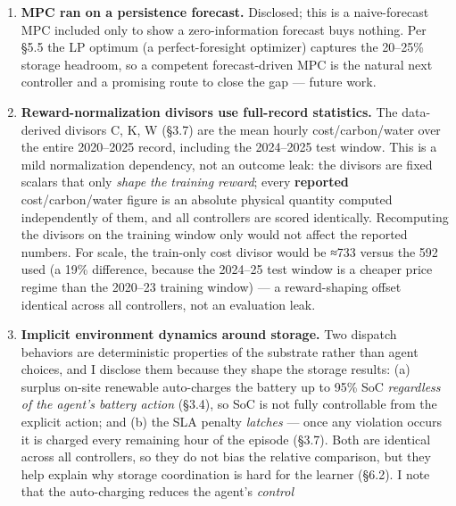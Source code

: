 \documentclass[
  11pt,
]{article}
\begin{document}
\begin{enumerate}
  8a. \textbf{The LP optimum is a conservative ceiling.} The LP does not
  exploit the cooling-offset cost lever and models deferral with the
  environment's own 1/12-per-hour backlog drain rather than free
  load-shifting; both make it \emph{under}-optimize slightly, so the
  reported optimality gaps (20--25\% on storage) are \textbf{lower
  bounds} on the true gap. It is verified to satisfy LP ≤ RuleBased on
  every episode.
\item
  \textbf{MPC ran on a persistence forecast.} Disclosed; this is a
  naive-forecast MPC included only to show a zero-information forecast
  buys nothing. Per §5.5 the LP optimum (a perfect-foresight optimizer)
  captures the 20--25\% storage headroom, so a competent forecast-driven
  MPC is the natural next controller and a promising route to close the
  gap --- future work.
\item
  \textbf{Reward-normalization divisors use full-record statistics.} The
  data-derived divisors C, K, W (§3.7) are the mean hourly
  cost/carbon/water over the entire 2020--2025 record, including the
  2024--2025 test window. This is a mild normalization dependency, not
  an outcome leak: the divisors are fixed scalars that only \emph{shape
  the training reward}; every \textbf{reported} cost/carbon/water figure
  is an absolute physical quantity computed independently of them, and
  all controllers are scored identically. Recomputing the divisors on
  the training window only would not affect the reported numbers. For
  scale, the train-only cost divisor would be ≈733 versus the 592 used
  (a 19\% difference, because the 2024--25 test window is a cheaper
  price regime than the 2020--23 training window) --- a reward-shaping
  offset identical across all controllers, not an evaluation leak.
\item
  \textbf{Implicit environment dynamics around storage.} Two dispatch
  behaviors are deterministic properties of the substrate rather than
  agent choices, and I disclose them because they shape the storage
  results: (a) surplus on-site renewable auto-charges the battery up to
  95\% SoC \emph{regardless of the agent's battery action} (§3.4), so
  SoC is not fully controllable from the explicit action; and (b) the
  SLA penalty \emph{latches} --- once any violation occurs it is charged
  every remaining hour of the episode (§3.7). Both are identical across
  all controllers, so they do not bias the relative comparison, but they
  help explain why storage coordination is hard for the learner (§6.2).
  I note that the auto-charging reduces the agent's \emph{control
}
\end{enumerate}
\end{document}

